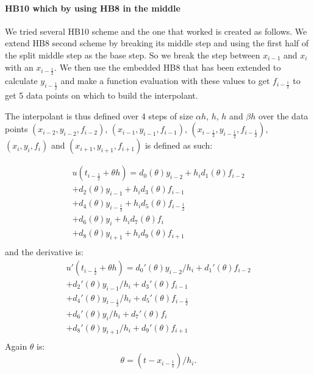 \paragraph{HB10 which by using HB8 in the middle}
We tried several HB10 scheme and the one that worked is created as follows. 
We extend HB8 second scheme by breaking its middle step and using the first half of the split middle step as the base step. So we break the step between $x_{i-1}$ and $x_i$ with an $x_{i - \frac{1}{2}}$. We then use the embedded HB8 that has been extended to calculate $y_{i- \frac{1}{2}}$ and make a function evaluation with these values to get $f_{i- \frac{1}{2}}$ to get 5 data points on which to build the interpolant.

The interpolant is thus defined over 4 steps of size $\alpha h$, $h$, $h$ and $\beta h$ over the data points $(x_{i-2}, y_{i-2}, f_{i-2})$, $(x_{i-1}, y_{i-1}, f_{i-1})$, $(x_{i-\frac{1}{2}}, y_{i-\frac{1}{2}}, f_{i-\frac{1}{2}})$, $(x_i, y_i, f_i)$ and $(x_{i + 1}, y_{i + 1}, f_{i + 1})$ is defined as such:

\begin{equation}
\begin{split}
u(t_{i-\frac{1}{2}} + \theta h) =
      d_0(\theta)y_{i-2}           + h_id_1(\theta)f_{i-2}\\
    + d_2(\theta)y_{i-1}           + h_id_3(\theta)f_{i-1}\\
    + d_4(\theta)y_{i-\frac{1}{2}} + h_id_5(\theta)f_{i-\frac{1}{2}}\\
    + d_6(\theta)y_i               + h_id_7(\theta)f_i \\
    + d_8(\theta)y_{i+1}           + h_id_9(\theta)f_{i+1}\\
\end{split}
\end{equation}
and the derivative is:
\begin{equation}
\begin{split}
u'(t_{i-\frac{1}{2}} + \theta h) = 
      d_0'(\theta)y_{i-2}/h_i           + d_1'(\theta)f_{i-2}\\
    + d_2'(\theta)y_{i-1}/h_i           + d_3'(\theta)f_{i-1}\\
    + d_4'(\theta)y_{i-\frac{1}{2}}/h_i + d_5'(\theta)f_{i-\frac{1}{2}}\\
    + d_6'(\theta)y_i/h_i               + d_7'(\theta)f_i \\
    + d_8'(\theta)y_{i+1}/h_i           + d_9'(\theta)f_{i+1}\\
\end{split}
\end{equation}
Again $\theta$ is:
\begin{equation}
\theta = (t - x_{i-\frac{1}{2}}) / h_i.
\end{equation}

